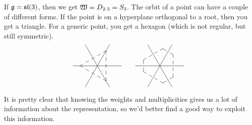 \begin{example}
   If $\mathfrak{g}=\mathfrak{sl}(3)$, then we get $\mathfrak{W}=D_{2\cdot 3}=S_3$. The orbit of a point can have a
   couple of different forms. If the point is on a hyperplane orthogonal to a root,
   then you get a triangle. For a generic point, you get a hexagon (which is not
   regular, but still symmetric).
   \[
    \begin{xy}<1.75em,0em>:
      a(180)+a(180); a(0)+a(0) **@{-},
      a(120)+a(120); a(-60)+a(-60) **@{-},
      a(60)+a(60); a(-120)+a(-120) **@{-},
      (0,0);<2.5em,0em>:
      a(60);
      a(180) **@{--};
      a(-60) **@{--};
      a(60) **@{--},
    \end{xy}\qquad
    \begin{xy}<1.75em,0em>:
      a(180)+a(180); a(0)+a(0) **@{-},
      a(120)+a(120); a(-60)+a(-60) **@{-},
      a(60)+a(60); a(-120)+a(-120) **@{-},
      (0,0);<2.5em,0em>:
      a(40);
      a(80) **@{--};
      a(160) **@{--};
      a(-160) **@{--};
      a(-80) **@{--};
      a(-40) **@{--};
      a(40) **@{--};
    \end{xy}
   \]
 \end{example}
 It is pretty clear that knowing the weights and multiplicities gives us a lot of
 information about the representation, so we'd better find a good way to exploit this
 information.

